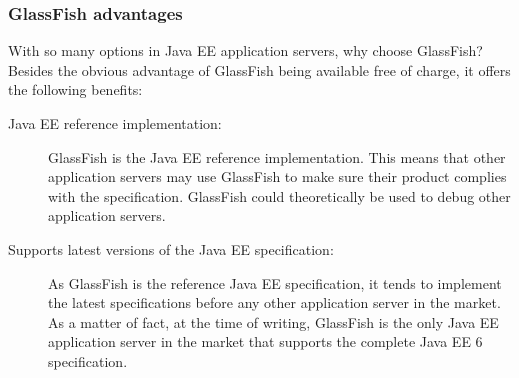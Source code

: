 \subsubsection{GlassFish advantages}
With so many options in Java EE application servers, why choose GlassFish? Besides the obvious advantage of GlassFish being available free of charge, it offers the following benefits:

\begin{description}
\item[Java EE reference implementation:] GlassFish is the Java EE reference implementation. This means that other application servers may use GlassFish to make sure their product complies with the specification. GlassFish could theoretically be used to debug other application servers.

\item[Supports latest versions of the Java EE specification:] As GlassFish is the reference Java EE specification, it tends to implement the latest specifications before any other application server in the market. As a matter of fact, at the time of writing, GlassFish is the only Java EE application server in the market that supports the complete Java EE 6 specification.
\end{description}

